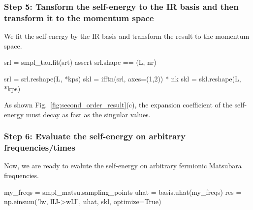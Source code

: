 \documentclass[submission, LectureNotes]{SciPost}
\newcommand{\wmax}{\ensuremath{{\omega_\mathrm{max}}}}
\newcommand\ii{\mathrm{i}}%
\newcommand{\hatFmat}{\hat{\mathbf{F}}}
\newcommand{\Fmat}{{\mathbf{F}}}
\begin{document}
\subsubsection*{Step 5: Tansform the self-energy to the IR basis and then transform it to the momentum space}
We fit the self-energy by the IR basis and transform the result to the momentum space.
\begin{python}
srl = smpl_tau.fit(srt)
assert srl.shape == (L, nr)

srl = srl.reshape(L, *kps)
skl = ifftn(srl, axes=(1,2)) * nk
skl = skl.reshape(L, *kps)
\end{python}
As shown Fig.~\ref{fig:second_order_result}(c), the expansion coefficient of the self-energy must
decay as fast as the singular values.
%
%

\subsubsection*{Step 6: Evaluate the self-energy on arbitrary frequencies/times}
Now, we are ready to evalute the self-energy on arbitrary fermionic Matsubara frequencies.
\begin{python}
my_freqs = smpl_matsu.sampling_points
uhat = basis.uhat(my_freqs)
res = np.einsum('lw, lIJ->wIJ', uhat, skl, optimize=True)
\end{python}


%
%
%
\end{document}
